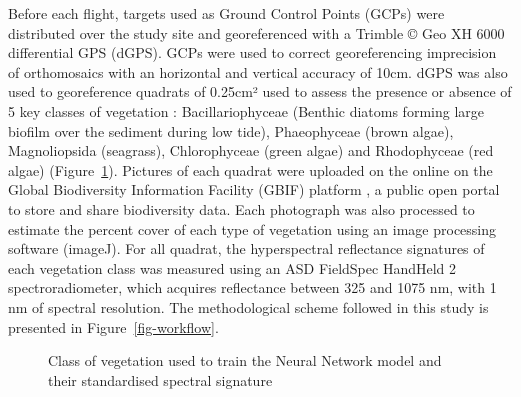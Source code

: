 \documentclass[
  number]{elsarticle}
\begin{document}
Before each flight, targets used as Ground Control Points (GCPs) were
distributed over the study site and georeferenced with a Trimble © Geo
XH 6000 differential GPS (dGPS). GCPs were used to correct
georeferencing imprecision of orthomosaics with an horizontal and
vertical accuracy of 10cm. dGPS was also used to georeference quadrats
of 0.25cm² used to assess the presence or absence of 5 key classes of
vegetation : Bacillariophyceae (Benthic diatoms forming large biofilm
over the sediment during low tide), Phaeophyceae (brown algae),
Magnoliopsida (seagrass), Chlorophyceae (green algae) and Rhodophyceae
(red algae) (Figure~\ref{fig-vegetation}). Pictures of each quadrat were
uploaded on the online on the Global Biodiversity Information Facility
(GBIF) platform \citep{BedeGbif}, a public open portal to store and
share biodiversity data. Each photograph was also processed to estimate
the percent cover of each type of vegetation using an image processing
software (imageJ). For all quadrat, the hyperspectral reflectance
signatures of each vegetation class was measured using an ASD FieldSpec
HandHeld 2 spectroradiometer, which acquires reflectance between 325 and
1075 nm, with 1 nm of spectral resolution. The methodological scheme
followed in this study is presented in Figure~\ref{fig-workflow}.

\label{cell-fig-vegetation}
\begin{figure}[H]


\caption{\label{fig-vegetation}Class of vegetation used to train the
Neural Network model and their standardised spectral signature}

\end{figure}%
\end{document}
